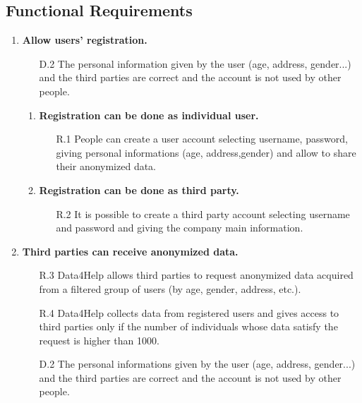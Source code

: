 \documentclass[a4paper]{article}
\begin{document}
    \subsection{Functional Requirements}
    
    \begin{enumerate}[label*=\bf{G.\arabic*}]
        
        \item \textbf{Allow users’ registration.}
        \begin{enumerate}
            \item [D.2] The personal information given by the user (age, address, gender...) and the third parties are correct and the account is not used by other people. 
        \end{enumerate}
        
        \begin{enumerate}[label*=\bf{.\arabic*}]
            \item \textbf{Registration can be done as individual user.}
            \begin{enumerate}
                \item [R.1] People can create a user account selecting username, password, giving personal informations (age, address,gender) and allow to share their anonymized data.
                
            \end{enumerate}
            
            \item \textbf{Registration can be done as third party.}
            \begin{enumerate}
                \item [R.2] It is possible to create a third party account selecting username and password and giving the company main information.
            \end{enumerate}
        \end{enumerate}
        
        \item \textbf{Third parties can receive anonymized data.}
                
        \begin{enumerate}
            \item [R.3] Data4Help allows third parties to request anonymized data acquired from a filtered group of users (by age, gender, address, etc.).
            \item [R.4] Data4Help collects data from registered users and gives access to third parties only if the number of individuals whose data satisfy the request is higher than 1000.
            \item [D.2] The personal informations given by the user (age, address, gender...) and the third parties are correct and the account is not used by other people.
        \end{enumerate}
            

\end{enumerate}
\end{document}
